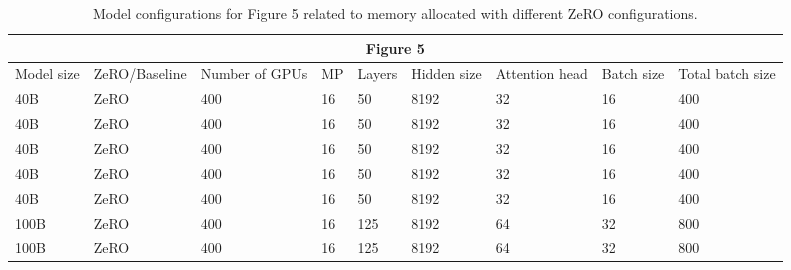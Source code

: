 \begin{table}[t!]
\scriptsize
\begin{tabular}{|l|l|l|l|l|l|l|l|l|}
\hline
\multicolumn{9}{|c|}{Figure 5} \\ \hline
Model size & ZeRO/Baseline & Number of GPUs & MP & Layers & Hidden size & Attention head & Batch size & Total batch size \\ \hline
40B & ZeRO & 400 & 16 & 50 & 8192 & 32 & 16 & 400 \\ \hline
40B & ZeRO & 400 & 16 & 50 & 8192 & 32 & 16 & 400 \\ \hline
40B & ZeRO & 400 & 16 & 50 & 8192 & 32 & 16 & 400 \\ \hline
40B & ZeRO & 400 & 16 & 50 & 8192 & 32 & 16 & 400 \\ \hline
40B & ZeRO & 400 & 16 & 50 & 8192 & 32 & 16 & 400 \\ \hline
100B & ZeRO & 400 & 16 & 125 & 8192 & 64 & 32 & 800 \\ \hline
100B & ZeRO & 400 & 16 & 125 & 8192 & 64 & 32 & 800 \\ \hline
\end{tabular}
\caption{Model configurations for Figure 5 related to memory allocated with different ZeRO configurations.}
\end{table}

